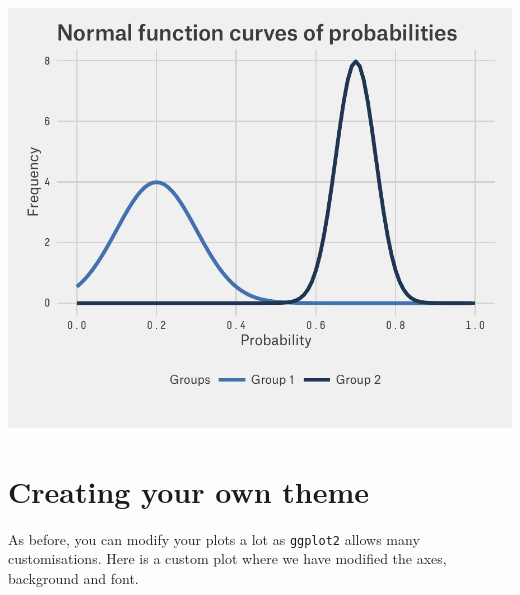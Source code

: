 \begin{center}\includegraphics[width=0.6\linewidth]{9_Function_Plots_pdf/function_16-1} \end{center}

\section{Creating your own theme}\label{creating-your-own-theme}

As before, you can modify your plots a lot as \texttt{ggplot2} allows
many customisations. Here is a custom plot where we have modified the
axes, background and font.

